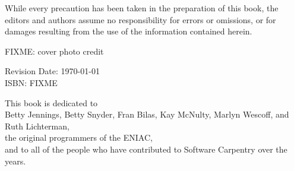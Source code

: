 \vspace{0.15cm}

\noindent While every precaution has been taken in the preparation of this
book, the editors and authors assume no responsibility for errors or omissions,
or for damages resulting from the use of the information contained herein.\\

\vspace{0.15cm}

\noindent FIXME: cover photo credit

\vspace{1cm}

\noindent Revision Date: \today \\

\noindent ISBN: FIXME
\normalsize

\newpage

\thispagestyle{empty}

\vspace*{5cm}

\begin{center}
\noindent
This book is dedicated to\\
Betty Jennings,
Betty Snyder,
Fran Bilas,
Kay McNulty,
Marlyn Wescoff,
and
Ruth Lichterman,\\
the original programmers of the ENIAC,\\
and to all of the people who have contributed to Software
Carpentry over the years.
\end{center}

\newpage

\thispagestyle{empty}
\mbox{}    %
